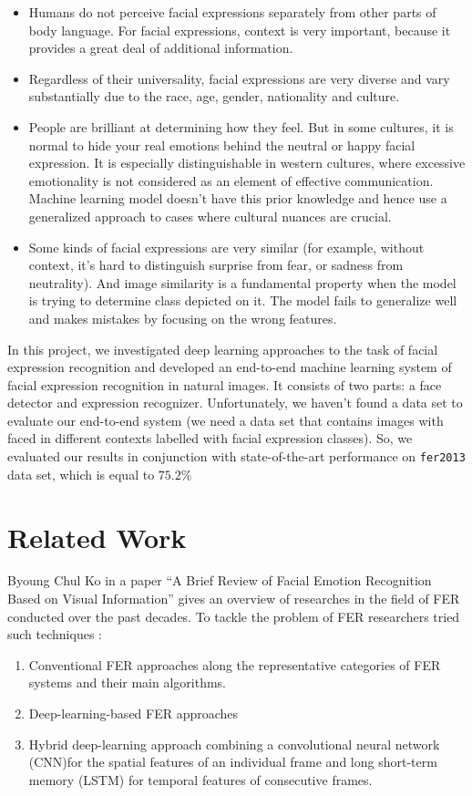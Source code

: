 \begin{itemize}
    \item 
    Humans do not perceive facial expressions separately from other parts of body language. For facial expressions, context is very important, because it provides a great deal of additional information.
    \item
    Regardless of their universality, facial expressions are very diverse and vary substantially due to the race, age, gender, nationality and culture.
    \item 
    People are brilliant at determining how they feel. But in some cultures, it is normal to hide your real emotions behind the neutral or happy facial expression. It is especially distinguishable in western cultures, where excessive emotionality is not considered as an element of effective communication. Machine learning model doesn't have this prior knowledge and hence use a generalized approach to cases where cultural nuances are crucial.
    \item 
    Some kinds of facial expressions are very similar (for example, without context, it's hard to distinguish surprise from fear, or sadness from neutrality). And image similarity is a fundamental property when the model is trying to determine class depicted on it. The model fails to generalize well and makes mistakes by focusing on the wrong features.
\end{itemize}



In this project, we investigated deep learning approaches to the task of facial expression recognition and  developed an end-to-end machine learning system of facial expression recognition in natural images. It consists of two parts: a face detector and expression recognizer. Unfortunately, we haven't found a data set to evaluate our end-to-end system (we need a data set that contains images with faced in different contexts labelled with facial expression classes). So, we evaluated our results in conjunction with state-of-the-art performance on \texttt{fer2013} data set, which is equal to $75.2\%$

\section{Related Work}

Byoung Chul Ko in a paper “A Brief Review of Facial Emotion Recognition Based on Visual Information”\cite{FERreview} gives an overview of researches in the field of FER conducted over the past decades. To tackle the problem of FER researchers tried such techniques : 
\begin{enumerate}
\item Conventional  FER  approaches along the  representative categories of FER systems and their main algorithms. 
\item Deep-learning-based FER approaches
\item Hybrid deep-learning approach combining a convolutional neural network (CNN)for the spatial features of an individual frame and long short-term memory (LSTM) for temporal features of consecutive frames.
\end{enumerate}

